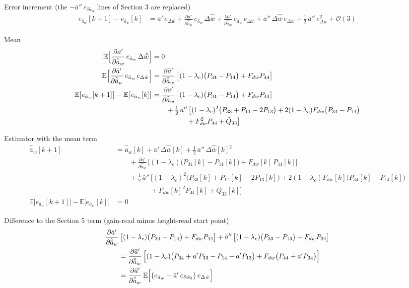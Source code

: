 \documentclass[11pt,a4paper,fontset=none]{ctexart}
\newcommand{\ba}{\bar{a}}
\newcommand{\bw}{\bar{w}}
\newcommand{\E}{\mathbb{E}}
\newcommand{\dWh}{\Delta\hat{\bw}}
\newcommand{\eD}{e_{\Delta\bw}}
\newcommand{\ap}{\ba'}
\newcommand{\app}{\ba''}
\begin{document}
Error increment (the $-\app\,e_{\delta\bw_3}$ lines of Section 3 are replaced)
\begin{align*}
e_{\ba_w}[k+1] - e_{\ba_w}[k]
  &= \ap\,\eD
     + \frac{\partial\ap}{\partial\hat{\ba}_w}\,e_{\ba_w}\,\dWh
     + \frac{\partial\ap}{\partial\hat{\ba}_w}\,e_{\ba_w}\,\eD
     + \app\,\dWh\,\eD
     + \tfrac{1}{2}\,\app\,\eD^{2}
     + \mathcal{O}(3)
\end{align*}

Mean
\begin{align*}
\E\Bigl[\frac{\partial\ap}{\partial\hat{\ba}_w}\,e_{\ba_w}\,\dWh\Bigr] &= 0 \\
\E\Bigl[\frac{\partial\ap}{\partial\hat{\ba}_w}\,e_{\ba_w}\,\eD\Bigr]
  &= \frac{\partial\ap}{\partial\hat{\ba}_w}\,\bigl[(1-\lambda_c)\bigl(P_{34} - P_{14}\bigr) + F_{dw}P_{44}\bigr] \\
\E\bigl[e_{\ba_w}[k+1]\bigr] - \E\bigl[e_{\ba_w}[k]\bigr]
  &= \frac{\partial\ap}{\partial\hat{\ba}_w}\,\bigl[(1-\lambda_c)\bigl(P_{34} - P_{14}\bigr) + F_{dw}P_{44}\bigr] \\
  &\qquad + \tfrac{1}{2}\,\app\,\bigl[(1-\lambda_c)^{2}\bigl(P_{33} + P_{11} - 2P_{13}\bigr)
     + 2(1-\lambda_c)F_{dw}\bigl(P_{34} - P_{14}\bigr) \\
  &\qquad\qquad\quad + F_{dw}^{2}P_{44} + \tilde{Q}_{33}\bigr]
\end{align*}

Estimator with the mean term
\begin{align*}
\hat{\ba}_w[k+1] &= \hat{\ba}_w[k] + \ap\,\dWh[k] + \tfrac{1}{2}\,\app\,\dWh[k]^{2} \\
  &\qquad + \frac{\partial\ap}{\partial\hat{\ba}_w}\,\bigl[(1-\lambda_c)\bigl(P_{34}[k] - P_{14}[k]\bigr) + F_{dw}[k]\,P_{44}[k]\bigr] \\
  &\qquad + \tfrac{1}{2}\,\app\,\bigl[(1-\lambda_c)^{2}\bigl(P_{33}[k] + P_{11}[k] - 2P_{13}[k]\bigr)
     + 2(1-\lambda_c)F_{dw}[k]\bigl(P_{34}[k] - P_{14}[k]\bigr) \\
  &\qquad\qquad\quad + F_{dw}[k]^{2}P_{44}[k] + \tilde{Q}_{33}[k]\bigr] \\
\E\bigl[e_{\ba_w}[k+1]\bigr] - \E\bigl[e_{\ba_w}[k]\bigr] &= 0
\end{align*}

Difference to the Section 5 term (gain-read minus height-read start point)
\begin{align*}
&\frac{\partial\ap}{\partial\hat{\ba}_w}\,\bigl[(1-\lambda_c)\bigl(P_{34} - P_{14}\bigr) + F_{dw}P_{44}\bigr]
  + \app\,\bigl[(1-\lambda_c)\bigl(P_{33} - P_{13}\bigr) + F_{dw}P_{34}\bigr] \\
&\qquad = \frac{\partial\ap}{\partial\hat{\ba}_w}\,\Bigl[(1-\lambda_c)\bigl(P_{34} + \ap P_{33} - P_{14} - \ap P_{13}\bigr) + F_{dw}\bigl(P_{44} + \ap P_{34}\bigr)\Bigr] \\
&\qquad = \frac{\partial\ap}{\partial\hat{\ba}_w}\,\E\Bigl[\bigl(e_{\ba_w} + \ap\,e_{\delta\bw_3}\bigr)\,\eD\Bigr]
\end{align*}
\end{document}
